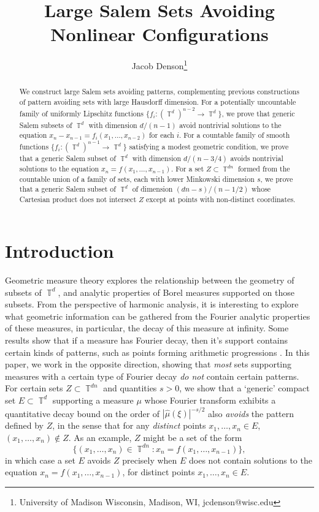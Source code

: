 \documentclass[dvipsnames,letterpaper,12pt]{article}
\title{Large Salem Sets Avoiding Nonlinear Configurations}
\author{Jacob Denson\footnote{University of Madison Wisconsin, Madison, WI, jcdenson@wisc.edu}}
\numberwithin{equation}{section}
\DeclareMathOperator{\TT}{\mathbb{T}}
\numberwithin{theorem}{section}
\begin{document}
\maketitle

\begin{abstract}
    We construct large Salem sets avoiding patterns, complementing previous constructions of pattern avoiding sets with large Hausdorff dimension. For a potentially uncountable family of uniformly Lipschitz functions $\{ f_i : (\TT^d)^{n-2} \to \TT^d \}$, we prove that generic Salem subsets of $\TT^d$ with dimension $d/(n-1)$ avoid nontrivial solutions to the equation $x_n - x_{n-1} = f_i(x_1,\dots,x_{n-2})$ for each $i$. For a countable family of smooth functions $\{ f_i : (\TT^d)^{n-1} \to \TT^d \}$ satisfying a modest geometric condition, we prove that a generic Salem subset of $\TT^d$ with dimension $d/(n-3/4)$ avoids nontrivial solutions to the equation $x_n = f(x_1,\dots,x_{n-1})$. For a set $Z \subset \TT^{dn}$ formed from the countable union of a family of sets, each with lower Minkowski dimension $s$, we prove that a generic Salem subset of $\TT^d$ of dimension $(dn - s)/(n - 1/2)$ whose Cartesian product does not intersect $Z$ except at points with non-distinct coordinates.
\end{abstract}

\section{Introduction}

Geometric measure theory explores the relationship between the geometry of subsets of $\TT^d$, and analytic properties of Borel measures supported on those subsets. From the perspective of harmonic analysis, it is interesting to explore what geometric information can be gathered from the Fourier analytic properties of these measures, in particular, the decay of this measure at infinity. Some results show that if a measure has Fourier decay, then it's support contains certain kinds of patterns, such as points forming arithmetic progressions \cite{ChanLabaPramanik, HenriotLabaPramanik,LabaPramanik}. In this paper, we work in the opposite direction, showing that \emph{most} sets supporting measures with a certain type of Fourier decay \emph{do not} contain certain patterns. For certain sets $Z \subset \TT^{dn}$ and quantities $s > 0$, we show that a `generic' compact set $E \subset \TT^d$ supporting a measure $\mu$ whose Fourier transform exhibits a quantitative decay bound on the order of $|\widehat{\mu}(\xi)|^{-s/2}$ also \emph{avoids} the pattern defined by $Z$, in the sense that for any \emph{distinct} points $x_1,\dots,x_n \in E$, $(x_1,\dots,x_n) \not \in Z$. As an example, $Z$ might be a set of the form
%
\[ \{ (x_1,\dots,x_n) \in \TT^{dn}: x_n = f(x_1,\dots,x_{n-1}) \}, \]
%
in which case a set $E$ avoids $Z$ precisely when $E$ does not contain solutions to the equation $x_n = f(x_1,\dots,x_{n-1})$, for distinct points $x_1,\dots,x_n \in E$.
\end{document}
